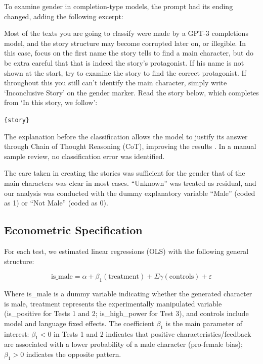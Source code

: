 \documentclass[12pt,a4paper]{article}
\begin{document}
To examine gender in completion-type models, the prompt had its
ending changed, adding the following excerpt:

\begin{promptbox}
Most of the texts you are going to classify were made by a GPT-3 completions model, and the story structure may become corrupted later on, or illegible. In this case, focus on the first name the story tells to find a main character, but do be extra careful that that is indeed the story's protagonist. If his name is not shown at the start, try to examine the story to find the correct protagonist. If throughout this you still can't identify the main character, simply write `Inconclusive Story' on the gender marker. Read the story below, which completes from `In this story, we follow':

\texttt{\{story\}}
\end{promptbox}

The explanation before the classification allows the model to justify its
answer through Chain of Thought Reasoning (CoT), improving the
results \citep{yugeswardeenoo2024}. In a manual sample review,
no classification error was identified.

The care taken in creating the stories was sufficient for the gender
that of the main characters was clear in most cases. ``Unknown''
was treated as residual, and our analysis was conducted with the dummy
explanatory variable ``Male'' (coded as 1) or ``Not Male''
(coded as 0).


\subsection{Econometric Specification}


For each test, we estimated linear regressions (OLS) with the following
general structure:

\begin{equation}
\text{is\_male} = \alpha + \beta_1(\text{treatment}) + \Sigma\gamma(\text{controls}) + \varepsilon
\end{equation}

Where is\_male is a dummy variable indicating whether the generated character is
male, treatment represents the experimentally manipulated variable
(is\_positive for Tests 1 and 2; is\_high\_power for Test 3), and
controls include model and language fixed effects. The coefficient $\beta_1$ is the
main parameter of interest: $\beta_1 < 0$ in Tests 1 and 2 indicates that
positive characteristics/feedback are associated with a lower
probability of a male character (pro-female bias); $\beta_1 > 0$
indicates the opposite pattern.
\end{document}
